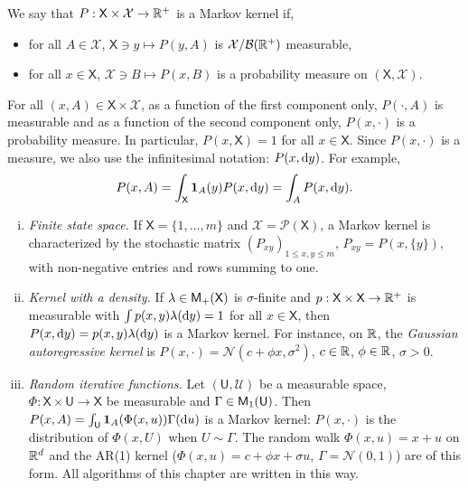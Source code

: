 \documentclass[english,graybox,envcountchap,envcountsame,sectrefs,shortlabels]{svmono}
\theoremstyle{style}
\newcommand{\Yset}{\mathsf{Y}}
\newcommand{\Ysigma}{\mathcal{Y}}
\newcommand{\gauss}{\mathcal{N}}
\newcommand{\eqsp}{}
\newcommand{\Xset}{\mathsf{X}}
\newcommand{\Xsigma}{\mathcal{X}}
\newcommand{\Uset}{\mathsf{U}}
\newcommand{\Usigma}{\mathcal{U}}
\begin{document}
\begin{definition}
We say that $P:\Xset\times\Xsigma\to\rset^{+}$
is a Markov kernel if,
\begin{itemize}[-]
\item for all $A\in\Xsigma$, $\Xset\ni y\mapsto P(y,A)$ is $\Xsigma/\mcbb(\rset^{+})$ measurable,
\item for all $x\in\Xset$, $\Xsigma\ni B\mapsto P(x,B)$ is a probability measure on $(\Xset,\Xsigma)$.
\end{itemize}
\end{definition}
For all $(x,A)\in\Xset\times\Xsigma$, as a function
of the first component only, $P(\cdot,A)$ is measurable and as a
function of the second component only, $P(x,\cdot)$ is a probability
measure. In particular, $P(x,\Xset)=1$ for all $x\in\Xset$. Since
$P(x,\cdot)$ is a measure, we also use the infinitesimal notation:
$P(x,\mathrm{d} y)$. For example, 
$$
P(x,A)=\int_{\Xset}\indi A(y)P(x,\rmd y)=\int_{A}P(x,\rmd y)\eqsp.
$$

\begin{example}
\label{ex:kernels}
\begin{enumerate}[i)]
\item \emph{Finite state space.} If $\Xset = \{1,\ldots,m\}$ and $\Xsigma = \mathcal{P}(\Xset)$, a Markov kernel is characterized by the stochastic matrix $(P_{xy})_{1\leq x,y\leq m}$, $P_{xy} = P(x,\{y\})$, with non-negative entries and rows summing to one.
\item \emph{Kernel with a density.} If $\lambda\in\meas +(\Xset)$ is $\sigma$-finite and $p:\Xset\times\Xset\to\rset^+$ is measurable with $\int p(x,y)\lambda(\mathrm{d} y) = 1$ for all $x\in\Xset$, then $P(x,\mathrm{d} y) = p(x,y)\lambda(\mathrm{d} y)$ is a Markov kernel. For instance, on $\mathbb{R}$, the \emph{Gaussian autoregressive kernel} is $P(x,\cdot) = \gauss(c+\phi x,\sigma^2)$, $c\in\mathbb{R}$, $\phi\in\mathbb{R}$, $\sigma>0$.
\item \emph{Random iterative functions.} Let $(\Uset,\Usigma)$ be a measurable space, $\Phi:\Xset\times\Uset\to\Xset$ be measurable and $\Gamma\in\meas 1(\Uset)$. Then $P(x,A) = \int_{\Uset} \indi{A}(\Phi(x,u))\Gamma(\rmd u)$ is a Markov kernel: $P(x,\cdot)$ is the distribution of $\Phi(x,U)$ when $U\sim\Gamma$. The random walk $\Phi(x,u)=x+u$ on $\mathbb{R}^d$ and the AR(1) kernel ($\Phi(x,u) = c+\phi x+\sigma u$, $\Gamma = \gauss(0,1)$) are of this form. All algorithms of this chapter are written in this way.
\end{enumerate}
\end{example}
 
\end{document}

